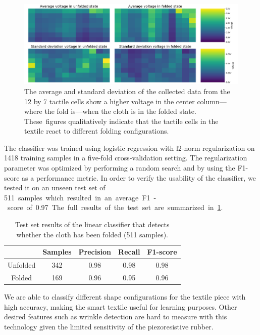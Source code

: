 \documentclass[\home/main.tex]{subfiles}
\begin{document}
\begin{figure}[htpb]
    \centering
    \includegraphics[width=\textwidth, keepaspectratio]{figures/sensor_data_over_states.png}
    \caption[Visualization of the statistics over the tactile grid cells.]{The average and standard deviation of the collected data from the 12 by 7 tactile cells show a higher voltage in the center column---where the fold is---when the cloth is in the folded state. These~figures qualitatively indicate that the tactile cells in the textile react to different folding configurations. }
    \label{fig:sensor_data}
\end{figure}

The classifier was trained using logistic regression with l2-norm regularization on \qty{1418}{} training samples in a five-fold cross-validation setting. The regularization parameter was optimized by performing a random search and by using the F1-score as a performance metric. In order to verify the usability of the classifier, we tested it on an unseen test set of \qty{511} samples which resulted in an average F1-score of \qty{0.97}{}. The full results of the test set are summarized in \cref{table:classifier_results}.

\begin{table}[htpb]
    \centering
    \caption{Test set results of the linear classifier that detects whether the cloth has been folded (511 samples).}
    \label{table:classifier_results}
    \begin{tabular}{@{} ccccc @{}}
        \toprule
                 & Samples & Precision & Recall & F1-score \\
        \midrule
        Unfolded & 342     & 0.98      & 0.98   & 0.98     \\
        Folded   & 169     & 0.96      & 0.95   & 0.96     \\
        \bottomrule
    \end{tabular}
\end{table}

We are able to classify different shape configurations for the textile piece with high accuracy, making the smart textile useful for learning purposes. Other desired features such as wrinkle detection are hard to measure with this technology given the limited sensitivity of the piezoresistive rubber.
\end{document}
